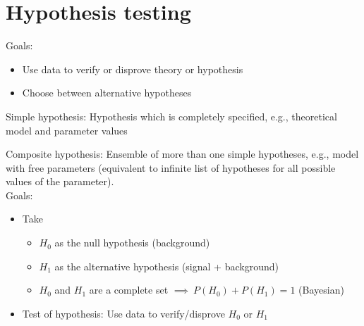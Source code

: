 \section{Hypothesis testing} \label{hypothesis_testing}
Goals: \begin{itemize}[$\to$]
    \item Use data to verify or disprove theory or hypothesis
    \item Choose between alternative hypotheses 
\end{itemize}

Simple hypothesis: Hypothesis which is completely specified, e.g., theoretical model and parameter values 

Composite hypothesis: Ensemble of more than one simple hypotheses, e.g., model with free parameters (equivalent to infinite list of hypotheses for all possible values of the parameter).\\


Goals: 
\begin{itemize}[$\to$]
    \item Take 
    \begin{itemize}[$\to$]
        \item $H_0$ as the null hypothesis (background)
        \item $H_1$ as the alternative hypothesis (signal + background)
        \item $H_0$ and $H_1$ are a complete set $\implies \: P(H_0)+P(H_1) = 1$ (Bayesian) 
    \end{itemize}
    \item Test of hypothesis: Use data to verify/disprove $H_0$ or $H_1$
\end{itemize}